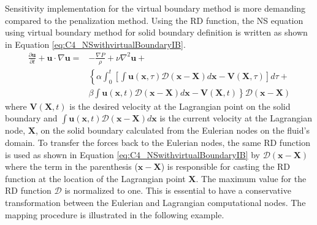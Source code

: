 Sensitivity implementation for the virtual boundary method is more demanding compared to the penalization method. Using the RD function, the NS equation using virtual boundary method for solid boundary definition is written as shown in Equation \eqref{eq:C4_NSwithvirtualBoundaryIB}.
%
\begin{align}\label{eq:C4_NSwithvirtualBoundaryIB}
    \frac{\partial \mathbf{u}}{\partial t} + 
    \mathbf{u} \cdot \nabla \mathbf{u} = 
    &-\frac{\nabla P}{\rho} + 
    \nu \nabla^2 \mathbf{u} + \nonumber \\
    &\left\{
    \alpha
    \int_0^t
    \left[
        \int \mathbf{u}(\mathbf{x}, \tau) \mathcal{D}(\mathbf{x} - \mathbf{X}) d\mathbf{x} - \mathbf{V}(\mathbf{X}, \tau)
    \right] d\tau \right.
    + \nonumber \\
    &
    \left.
    \beta
    \int \mathbf{u}(\mathbf{x}, t) \mathcal{D}(\mathbf{x} - \mathbf{X}) d\mathbf{x} - \mathbf{V}(\mathbf{X}, t)
    \right\} \mathcal{D}(\mathbf{x} - \mathbf{X})
\end{align}
%
where $\mathbf{V}(\mathbf{X}, t)$ is the desired velocity at the Lagrangian point on the solid boundary and $\int \mathbf{u}(\mathbf{x}, t) \mathcal{D}(\mathbf{x} - \mathbf{X}) d\mathbf{x}$ is the current velocity at the Lagrangian node, $\mathbf{X}$, on the solid boundary calculated from the Eulerian nodes on the fluid's domain. To transfer the forces back to the Eulerian nodes, the same RD function is used as shown in Equation \eqref{eq:C4_NSwithvirtualBoundaryIB} by $\mathcal{D}(\mathbf{x} - \mathbf{X})$ where the term in the parenthesis ($\mathbf{x} - \mathbf{X}$) is responsible for casting the RD function at the location of the Lagrangian point $\mathbf{X}$. The maximum value for the RD function $\mathcal{D}$ is normalized to one. This is essential to have a conservative transformation between the Eulerian and Lagrangian computational nodes. The mapping procedure is illustrated in the following example.

